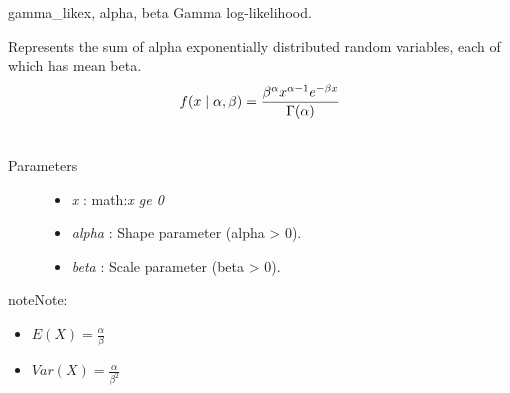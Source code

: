 \hypertarget{pymc.distributions.gamma_like}{}\begin{funcdesc}{gamma\_like}{x, alpha, beta}
Gamma log-likelihood.

Represents the sum of alpha exponentially distributed random variables, each
of which has mean beta.
\begin{gather}
\begin{split}f(x \mid \alpha, \beta) = \frac{\beta^{\alpha}x^{\alpha-1}e^{-\beta x}}{\Gamma(\alpha)}\end{split}\notag\\\begin{split}\end{split}\notag
\end{gather}\begin{description}
\item[Parameters] \leavevmode\begin{itemize}
\item {} 
\emph{x} : math:\emph{x ge 0}

\item {} 
\emph{alpha} : Shape parameter (alpha \textgreater{} 0).

\item {} 
\emph{beta} : Scale parameter (beta \textgreater{} 0).

\end{itemize}

\end{description}

\begin{notice}{note}{Note:}\begin{itemize}
\item {} 
$E(X) = \frac{\alpha}{\beta}$

\item {} 
$Var(X) = \frac{\alpha}{\beta^2}$

\end{itemize}
\end{notice}
\end{funcdesc}


